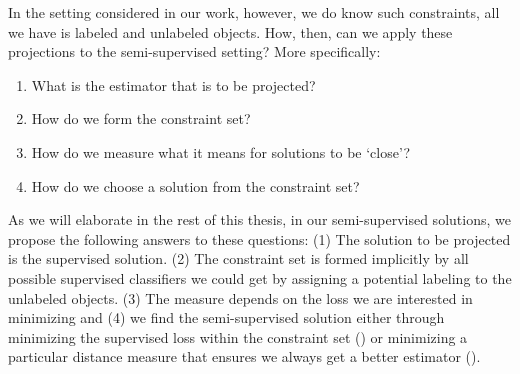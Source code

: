 \documentclass[twoside]{memoir}\usepackage[]{graphicx}\usepackage{xcolor}
\begin{document}
In the setting considered in our work, however, we do know such constraints, all we have is labeled and unlabeled objects. How, then, can we apply these projections to the semi-supervised setting? More specifically:
\begin{enumerate}
\item What is the estimator that is to be projected?
\item How do we form the constraint set?
\item How do we measure what it means for solutions to be `close'?
\item How do we choose a solution from the constraint set?
\end{enumerate}
As we will elaborate in the rest of this thesis, in our semi-supervised solutions, we propose the following answers to these questions: (1) The solution to be projected is the supervised solution. (2) The constraint set is formed implicitly by all possible supervised classifiers we could get by assigning a potential labeling to the unlabeled objects. (3) The measure depends on the loss we are interested in minimizing and (4) we find the semi-supervised solution either through minimizing the supervised loss within the constraint set () or minimizing a particular distance measure that ensures we always get a better estimator ().
\end{document}

